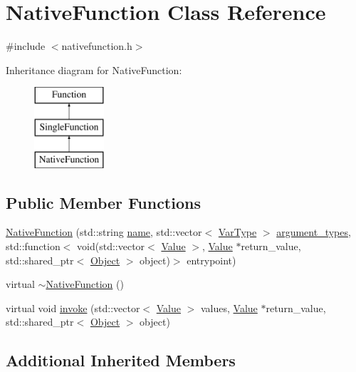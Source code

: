 \hypertarget{classNativeFunction}{}\section{Native\+Function Class Reference}
\label{classNativeFunction}


{\ttfamily \#include $<$nativefunction.\+h$>$}

Inheritance diagram for Native\+Function\+:\begin{figure}[H]
\begin{center}
\leavevmode
\includegraphics[height=3.000000cm]{classNativeFunction}
\end{center}
\end{figure}
\subsection*{Public Member Functions}
\begin{DoxyCompactItemize}
\item 
\hyperlink{classNativeFunction_a189f9fd9161c741e533c3dc2c8396f31}{Native\+Function} (std\+::string \hyperlink{classFunction_a161d1ceb4f67f3222caf429fea7b71f1}{name}, std\+::vector$<$ \hyperlink{classVarType}{Var\+Type} $>$ \hyperlink{classSingleFunction_a345cc7c6a42587a62495688af6644a26}{argument\+\_\+types}, std\+::function$<$ void(std\+::vector$<$ \hyperlink{classValue}{Value} $>$, \hyperlink{classValue}{Value} $\ast$return\+\_\+value, std\+::shared\+\_\+ptr$<$ \hyperlink{classObject}{Object} $>$ object)$>$ entrypoint)
\item 
virtual \hyperlink{classNativeFunction_aa6055c6a092b8be8d1f9009efc6db0e0}{$\sim$\+Native\+Function} ()
\item 
virtual void \hyperlink{classNativeFunction_a0f003d805cbc3625e311d1b2a1b861d9}{invoke} (std\+::vector$<$ \hyperlink{classValue}{Value} $>$ values, \hyperlink{classValue}{Value} $\ast$return\+\_\+value, std\+::shared\+\_\+ptr$<$ \hyperlink{classObject}{Object} $>$ object)
\end{DoxyCompactItemize}
\subsection*{Additional Inherited Members}


